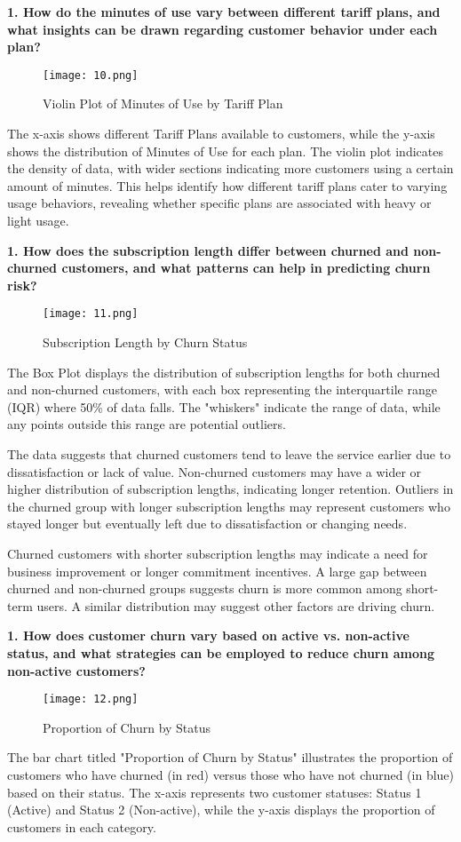 \documentclass[12pt]{article}
\begin{document}
\vspace{0.5cm}
\textbf{1. How do the minutes of use vary between different tariff plans, and what insights can be drawn regarding customer behavior under each plan?}
\begin{figure}[h]
    \centering
    \texttt{[image: 10.png]}  
    \caption{Violin Plot of Minutes of Use by Tariff Plan}
\end{figure}
\FloatBarrier
The x-axis shows different Tariff Plans available to customers, while the y-axis shows the distribution of Minutes of Use for each plan. The violin plot indicates the density of data, with wider sections indicating more customers using a certain amount of minutes. This helps identify how different tariff plans cater to varying usage behaviors, revealing whether specific plans are associated with heavy or light usage.

\vspace{0.5cm}
\textbf{1. How does the subscription length differ between churned and non-churned customers, and what patterns can help in predicting churn risk?}
\begin{figure}[h]
    \centering
    \texttt{[image: 11.png]}  
    \caption{Subscription Length by Churn Status}
\end{figure}
\FloatBarrier
The Box Plot displays the distribution of subscription lengths for both churned and non-churned customers, with each box representing the interquartile range (IQR) where 50\% of data falls. The "whiskers" indicate the range of data, while any points outside this range are potential outliers.

The data suggests that churned customers tend to leave the service earlier due to dissatisfaction or lack of value. Non-churned customers may have a wider or higher distribution of subscription lengths, indicating longer retention. Outliers in the churned group with longer subscription lengths may represent customers who stayed longer but eventually left due to dissatisfaction or changing needs.

Churned customers with shorter subscription lengths may indicate a need for business improvement or longer commitment incentives. A large gap between churned and non-churned groups suggests churn is more common among short-term users. A similar distribution may suggest other factors are driving churn.

\vspace{0.5cm}
\textbf{1. How does customer churn vary based on active vs. non-active status, and what strategies can be employed to reduce churn among non-active customers?}
\begin{figure}[h]
    \centering
    \texttt{[image: 12.png]}  
    \caption{Proportion of Churn by Status}
\end{figure}
\FloatBarrier
The bar chart titled "Proportion of Churn by Status" illustrates the proportion of customers who have churned (in red) versus those who have not churned (in blue) based on their status. The x-axis represents two customer statuses: Status 1 (Active) and Status 2 (Non-active), while the y-axis displays the proportion of customers in each category.
\end{document}
